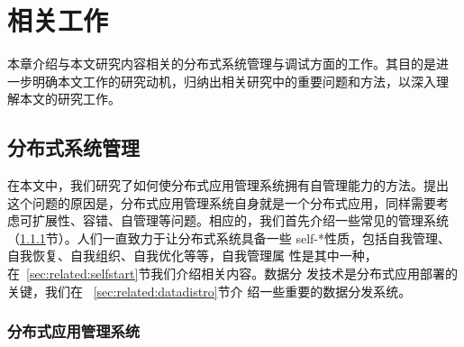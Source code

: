 \chapter{相关工作}
\label{chap:related}

本章介绍与本文研究内容相关的分布式系统管理与调试方面的工作。其目的是进
一步明确本文工作的研究动机，归纳出相关研究中的重要问题和方法，以深入理
解本文的研究工作。






\section{分布式系统管理}


% 
% 
% 
% 
% 
% 

在本文中，我们研究了如何使分布式应用管理系统拥有自管理能力的方法。提出
这个问题的原因是，分布式应用管理系统自身就是一个分布式应用，同样需要考
虑可扩展性、容错、自管理等问题。相应的，我们首先介绍一些常见的管理系统
（\ref{sec:related:mgmtsys}节）。人们一直致力于让分布式系统具备一些
self-*性质，包括自我管理、自我恢复、自我组织、自我优化等等，自我管理属
性是其中一种，在~\ref{sec:related:selfstart}节我们介绍相关内容。数据分
发技术是分布式应用部署的关键，我们在~ \ref{sec:related:datadistro}节介
绍一些重要的数据分发系统。

\subsection{分布式应用管理系统}
\label{sec:related:mgmtsys}

